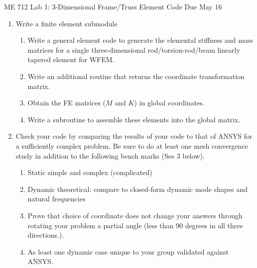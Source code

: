 \documentclass[11pt]{article}
\begin{document}
\begin{center}
        \LARGE{ME 712 Lab 1: 3-Dimensional Frame/Truss Element Code}
        Due May 16
\end{center}
\vspace{.3in}
\begin{enumerate}
\item Write a finite element submodule
\begin{enumerate}
\item Write a general element code to generate the elemental stiffness and mass matrices  for a single three-dimensional rod/torsion-rod/beam linearly tapered element for WFEM. 


\item Write an additional routine that returns the coordinate transformation matrix.

\item Obtain the FE matrices ($M$ and $K$) in global coordinates.

\item Write a subroutine to assemble these elements into the global matrix.
\end{enumerate}


\item Check your code by comparing the results of your code to that of ANSYS  for a sufficiently complex problem. Be sure to do at least one mesh convergence study in addition to the following bench marks (See 3 below).

\begin{enumerate}
\item Static simple and complex (complicated)
\item Dynamic theoretical: compare to closed-form dynamic mode shapes and natural frequencies
\item Prove that choice of coordinate does not change your answers through rotating your problem a partial angle (less than 90 degrees in all three directions.). 
\item As least one dynamic case unique to your group validated against ANSYS. 
\end{enumerate}


\end{enumerate}
\end{document}
